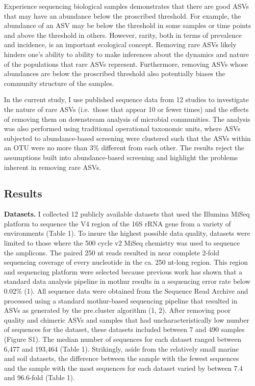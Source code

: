 \documentclass[
]{article}
\begin{document}
Experience sequencing biological samples demonstrates that there are
good ASVs that may have an abundance below the proscribed threshold. For
example, the abundance of an ASV may be below the threshold in some
samples or time points and above the threshold in others. However,
rarity, both in terms of prevalence and incidence, is an important
ecological concept. Removing rare ASVs likely hinders one's ability to
ability to make inferences about the dynamics and nature of the
populations that rare ASVs represent. Furthermore, removing ASVs whose
abundances are below the proscribed threshold also potentially biases
the community structure of the samples.

In the current study, I use published sequence data from 12 studies to
investigate the nature of rare ASVs (i.e.~those that appear 10 or fewer
times) and the effects of removing them on downstream analysis of
microbial communities. The analysis was also performed using traditional
operational taxonomic units, where ASVs subjected to abundance-based
screening were clustered such that the ASVs within an OTU were no more
than 3\% different from each other. The results reject the assumptions
built into abundance-based screening and highlight the problems inherent
in removing rare ASVs.

\hypertarget{results}{%
\subsection{Results}\label{results}}

\textbf{Datasets.} I collected 12 publicly available datasets that used
the Illumina MiSeq platform to sequence the V4 region of the 16S rRNA
gene from a variety of environments (Table 1). To insure the highest
possible data quality, datasets were limited to those where the 500
cycle v2 MiSeq chemistry was used to sequence the amplicons. The paired
250 nt reads resulted in near complete 2-fold sequencing coverage of
every nucleotide in the ca. 250 nt-long region. This region and
sequencing platform were selected because previous work has shown that a
standard data analysis pipeline in mothur results in a sequencing error
rate below 0.02\% (1). All sequence data were obtained from the Sequence
Read Archive and processed using a standard mothur-based sequencing
pipeline that resulted in ASVs as generated by the pre.cluster algorithm
(1, 2). After removing poor quality and chimeric ASVs and samples that
had uncharacteristically low number of sequences for the dataset, these
datasets included between 7 and 490 samples (Figure S1). The median
number of sequences for each dataset ranged between 6,477 and 193,464
(Table 1). Strikingly, aside from the relatively small marine and soil
datasets, the difference between the sample with the fewest sequences
and the sample with the most sequences for each dataset varied by
between 7.4 and 96.6-fold (Table 1).
\end{document}
